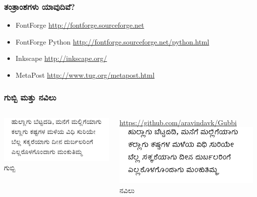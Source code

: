 \documentclass[16pt]{beamer}
\newcommand\en[1]{{\english #1}}
\begin{document}
\begin{spacing}{1.6}
  \begin{frame}
    \frametitle{ತಂತ್ರಾಂಶಗಳು ಯಾವುದಿವೆ?}
    \begin{itemize}
    \item \en{FontForge} \url{http://fontforge.sourceforge.net}
    \item \en{FontForge Python} \url{http://fontforge.sourceforge.net/python.html}
    \item \en{Inkscape} \url{http://inkscape.org/}
    \item \en{MetaPost} \url{http://www.tug.org/metapost.html}
    \end{itemize}
  \end{frame}

  \begin{frame}
    \frametitle{ಗುಬ್ಬಿ ಮತ್ತು ನವಿಲು}
    \begin{columns}[t]
      \column{5cm}
      \includegraphics[width=\textwidth]{images/gubbi-showcase.png} \\
      \LARGE{ಗುಬ್ಬಿ}

      \normalsize \url{https://github.com/aravindavk/Gubbi}
      \column{5cm}
      \includegraphics[width=\textwidth]{images/navilu-showcase.png} \\
      \LARGE{ನವಿಲು}


\end{columns}
\end{frame}
\end{spacing}
\end{document}
